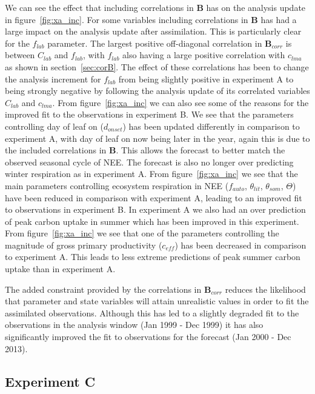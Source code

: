 \documentclass[review]{elsarticle}
\begin{document}
We can see the effect that including correlations in $\textbf{B}$ has on the analysis update in figure~\ref{fig:xa_inc}. For some variables including correlations in $\textbf{B}$ has had a large impact on the analysis update after assimilation. This is particularly clear for the $f_{lab}$ parameter. The largest positive off-diagonal correlation in $\textbf{B}_{corr}$ is between $C_{lab}$ and $f_{lab}$, with $f_{lab}$ also having a large positive correlation with $c_{lma}$ as shown in section~\ref{sec:corB}. The effect of these correlations has been to change the analysis increment for $f_{lab}$ from being slightly positive in experiment A to being strongly negative by following the analysis update of its correlated variables $C_{lab}$ and $c_{lma}$. From figure~\ref{fig:xa_inc} we can also see some of the reasons for the improved fit to the observations in experiment B. We see that the parameters controlling day of leaf on ($d_{onset}$) has been updated differently in comparison to experiment A, with day of leaf on now being later in the year, again this is due to the included correlations in $\textbf{B}$. This allows the forecast to better match the observed seasonal cycle of NEE. The forecast is also no longer over predicting winter respiration as in experiment A. From figure~\ref{fig:xa_inc} we see that the main parameters controlling ecosystem respiration in NEE ($f_{auto}$, $\theta_{lit}$, $\theta_{som}$, $\Theta$) have been reduced in comparison with experiment A, leading to an improved fit to observations in experiment B. In experiment A we also had an over prediction of peak carbon uptake in summer which has been improved in this experiment. From figure~\ref{fig:xa_inc} we see that one of the parameters controlling the magnitude of gross primary productivity ($c_{eff}$) has been decreased in comparison to experiment A. This leads to less extreme predictions of peak summer carbon uptake than in experiment A.

The added constraint provided by the correlations in $\textbf{B}_{corr}$ reduces the likelihood that parameter and state variables will attain unrealistic values in order to fit the assimilated observations. Although this has led to a slightly degraded fit to the observations in the analysis window (Jan 1999 - Dec 1999) it has also significantly improved the fit to observations for the forecast (Jan 2000 - Dec 2013).

\subsection{Experiment C} \label{sec:expc}
\end{document}
